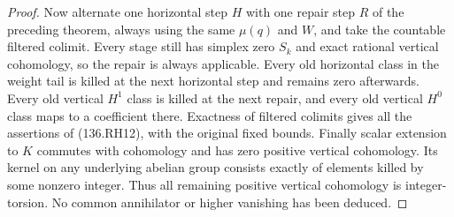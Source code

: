 \begin{proof}
Now alternate one horizontal step $H$ with one repair step
$R$ of the preceding theorem, always using the same $\mu(q)$
and $W$, and take the countable filtered colimit. Every stage
still has simplex zero $S_k$ and exact rational vertical
cohomology, so the repair is always applicable. Every old
horizontal class in the weight tail is killed at the next
horizontal step and remains zero afterwards. Every old
vertical $H^1$ class is killed at the next repair, and every
old vertical $H^0$ class maps to a coefficient there.
Exactness of filtered colimits gives all the assertions of
(136.RH12), with the original fixed bounds.
Finally scalar extension to $K$ commutes with cohomology and
has zero positive vertical cohomology. Its kernel on any
underlying abelian group consists exactly of elements killed
by some nonzero integer. Thus all remaining positive vertical
cohomology is integer-torsion. No common annihilator or higher
vanishing has been deduced.
\end{proof}
